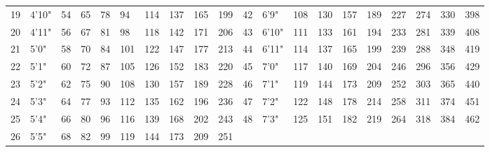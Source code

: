 \begin{tabularx}{\linewidth}{@{} X X X X X X X X X X | X X X X X X X X X X}
19 & 4'10" & 54 & 65 & 78 & 94 & 114 & 137 & 165 & 199 & 42 & 6'9" & 108 & 130 & 157 & 189 & 227 & 274 & 330 & 398\\
20 & 4'11" & 56 & 67 & 81 & 98 & 118 & 142 & 171 & 206 & 43 & 6'10" & 111 & 133 & 161 & 194 & 233 & 281 & 339 & 408\\
21 & 5'0" & 58 & 70 & 84 & 101 & 122 & 147 & 177 & 213 & 44 & 6'11" & 114 & 137 & 165 & 199 & 239 & 288 & 348 & 419\\
22 & 5'1" & 60 & 72 & 87 & 105 & 126 & 152 & 183 & 220 & 45 & 7'0" & 117 & 140 & 169 & 204 & 246 & 296 & 356 & 429\\
23 & 5'2" & 62 & 75 & 90 & 108 & 130 & 157 & 189 & 228 & 46 & 7'1" & 119 & 144 & 173 & 209 & 252 & 303 & 365 & 440\\
24 & 5'3" & 64 & 77 & 93 & 112 & 135 & 162 & 196 & 236 & 47 & 7'2" & 122 & 148 & 178 & 214 & 258 & 311 & 374 & 451\\
25 & 5'4" & 66 & 80 & 96 & 116 & 139 & 168 & 202 & 243 & 48 & 7'3" & 125 & 151 & 182 & 219 & 264 & 318 & 384 & 462\\
26 & 5'5" & 68 & 82 & 99 & 119 & 144 & 173 & 209 & 251 & 									
\end{tabularx}